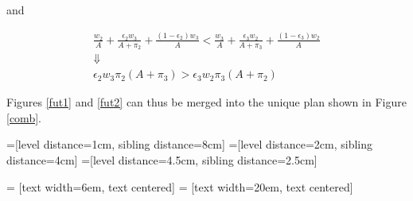 \documentclass[11pt]{llncs}
\begin{document}
and

\begin{gather*}
\frac{w_2}{A}+\frac{\epsilon_2 w_3}{A+\pi_2}+\frac{(1-\epsilon_2) w_3}{A}<\frac{w_3}{A}+\frac{\epsilon_3 w_2}{A+\pi_3}+\frac{(1-\epsilon_3) w_2}{A}\\
\Downarrow\\
\epsilon_2 w_3 \pi_2(A+\pi_3)>\epsilon_3 w_2 \pi_3(A+\pi_2)
\end{gather*}

Figures \ref{fut1} and \ref{fut2} can thus be merged into the unique plan shown in Figure \ref{comb}.

=[level distance=1cm, sibling distance=8cm]
=[level distance=2cm, sibling distance=4cm]
=[level distance=4.5cm, sibling distance=2.5cm]

 = [text width=6em, text centered]
 = [text width=20em, text centered]
\end{document}
